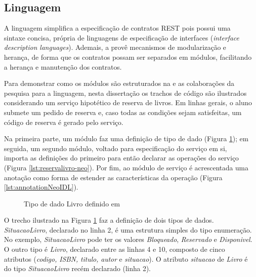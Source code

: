 \subsection{Linguagem}
\label{linguagemNeoIDL}
\vspace{-6mm}

A linguagem \neoidl{} simplifica a especificação de contratos REST pois possui
uma sintaxe concisa, própria de linguagens de especificação de interfaces
(\emph{interface description languages}). Ademais, a \neoidl{} provê mecanismos de
modularização e herança, de forma que os contratos possam ser separados em
módulos, facilitando a herança e manutenção dos
contratos. 

Para demonstrar como os módulos são estruturados na
\neoidl{} e as colaborações da pesquisa para a linguagem, nesta dissertação os
trachos de código \neoidl{} são ilustrados considerando um serviço
hipotético de reserva de livros. Em linhas gerais, o aluno submete um pedido de reserva e, caso todas as condições
sejam satisfeitas, um código de reserva é gerado pelo serviço.

Na primeira parte, um módulo faz uma definição de
tipo de dado (Figura \ref{lst:livrodata-neo}); em seguida, um segundo módulo,
voltado para especificação do serviço em si, importa as definições do primeiro para então declarar as operações do
serviço (Figura \ref{lst:reservalivro-neo}). Por fim, ao módulo de serviço é acrescentada
uma anotação como forma de estender as características da operação (Figura
\ref{lst:annotationNeoIDL}).


\vspace{6mm}

\begin{figure}[h]
\begin{small}
%

\vspace{-.5cm}
\end{small} 
\caption{Tipo de dado Livro definido em \neoidl}
\label{lst:livrodata-neo}
\end{figure}

O trecho ilustrado na Figura \ref{lst:livrodata-neo} faz a definição de
dois tipos de dados. \emph{SituacaoLivro}, declarado no linha 2, é uma estrutura
simples do tipo enumeração. No exemplo, \emph{SituacaoLivro} pode ter os valores
\emph{Bloqueado}, \emph{Reservado} e \emph{Disponivel}.
O outro tipo é \emph{Livro}, declarado entre as linhas 4 e 10,
composto de cinco atributos (\emph{codigo, ISBN, titulo, autor} e
\emph{situacao}).
O atributo \emph{situacao} de \emph{Livro} é do tipo \emph{SituacaoLivro} recém
declarado (linha 2).

